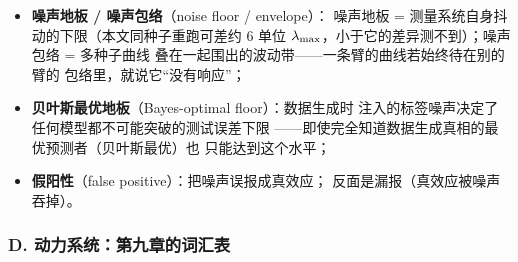 \begin{itemize}
        指实验本身做得干不干净（本文的确定性协议就是在保内部效度）
        ；
  \item \textbf{噪声地板 / 噪声包络}（noise floor / envelope）：
        噪声地板 = 测量系统自身抖动的下限（本文同种子重跑可差约 6
        单位 $\lambda_{\max}$，小于它的差异测不到）；噪声包络 = 多种子曲线
        叠在一起围出的波动带——一条臂的曲线若始终待在别的臂的
        包络里，就说它``没有响应''；
  \item \textbf{贝叶斯最优地板}（Bayes-optimal floor）：数据生成时
        注入的标签噪声决定了任何模型都不可能突破的测试误差下限
        ——即使完全知道数据生成真相的最优预测者（贝叶斯最优）也
        只能达到这个水平；
  \item \textbf{假阳性}（false positive）：把噪声误报成真效应；
        反面是漏报（真效应被噪声吞掉）。
\end{itemize}

\subsubsection*{D. 动力系统：第九章的词汇表}

